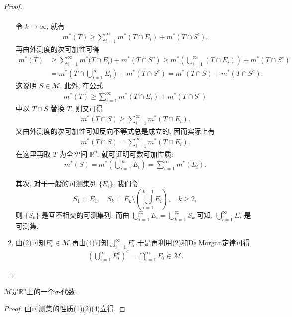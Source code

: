 \documentclass[../../main.tex]{subfiles}
\begin{document}
\begin{proof}
\begin{enumerate}[(1)]
\begin{align*}
\end{align*}
令 \(k \to \infty\), 就有
\begin{align*}
m^*(T) \geq \sum_{i = 1}^{\infty} m^*(T \cap E_i) + m^*(T \cap S^c).
\end{align*}
再由外测度的次可加性可得
\begin{align*}
m^*(T)&\geqslant \sum_{i=1}^{\infty}{m^*(T}\cap E_i)+m^*(T\cap S^c)\geqslant m^*(\bigcup_{i=1}^{\infty}{\left( T\cap E_i \right)})+m^*(T\cap S^c)
\\
&=m^*(T\cap \bigcup_{i=1}^{\infty}{E_i})+m^*(T\cap S^c)=m^*(T\cap S)+m^*(T\cap S^c).
\end{align*}
这说明 \(S \in \mathscr{M}\).
此外, 在公式
\begin{align*}
m^*(T) \geq \sum_{i = 1}^{\infty} m^*(T \cap E_i) + m^*(T \cap S^c)
\end{align*}
中以 \(T \cap S\) 替换 \(T\), 则又可得
\begin{align*}
m^*(T \cap S) \geq \sum_{i = 1}^{\infty} m^*(T \cap E_i).
\end{align*}
又由外测度的次可加性可知反向不等式总是成立的, 因而实际上有
\begin{align*}
m^*(T \cap S) = \sum_{i = 1}^{\infty} m^*(T \cap E_i).
\end{align*}
在这里再取 \(T\) 为全空间 \(\mathbb{R}^n\), 就可证明可数可加性质:
\begin{align*}
m^*(S) = m^*\left(\bigcup_{i = 1}^{\infty} E_i\right) = \sum_{i = 1}^{\infty} m^*(E_i).
\end{align*}

其次, 对于一般的可测集列 \(\{E_i\}\), 我们令
\[
S_1 = E_1, \quad S_k = E_k \setminus \left(\bigcup_{i = 1}^{k - 1} E_i\right), \quad k \geq 2,
\]
则 \(\{S_k\}\) 是互不相交的可测集列. 而由 \(\bigcup_{i = 1}^{\infty} E_i = \bigcup_{k = 1}^{\infty} S_k\) 可知, \(\bigcup_{i = 1}^{\infty} E_i\) 是可测集.

\item 由(2)可知$E_i^c\in \mathscr{M}$,再由(4)可知$\bigcup_{i = 1}^{\infty} E_i^c$.于是再利用(2)和De Morgan定律可得
\begin{align*}
\left( \bigcup_{i=1}^{\infty}{E_{i}^{c}} \right) ^c=\bigcap_{i=1}^{\infty}{E_i}\in \mathscr{M} .
\end{align*}
\end{enumerate} 
\end{proof}

\begin{corollary}\label{corollary:可测集类是sigma-代数}
$\mathscr{M}$是$\mathbb{R}^n$上的一个$\sigma$-代数.
\end{corollary}
\begin{proof}
由\hyperref[theorem:可测集的性质]{可测集的性质(1)(2)(4)}立得.
\end{proof}
\end{document}
